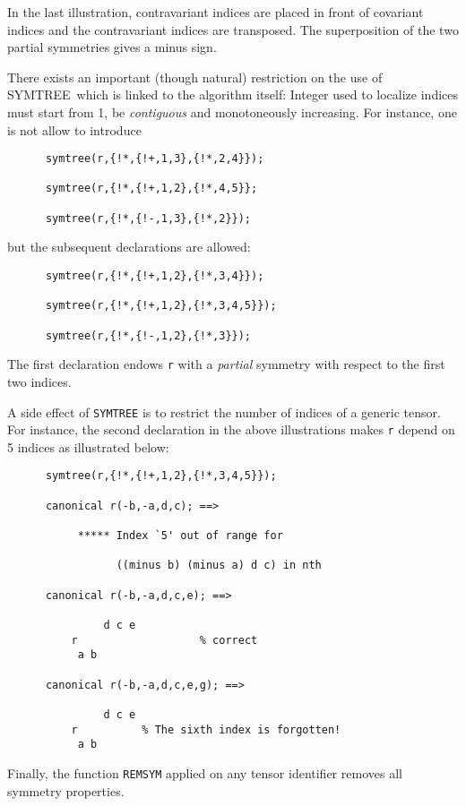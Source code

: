 In the last illustration, contravariant indices are placed in front
of covariant indices and the contravariant indices are transposed.
The superposition of the two partial symmetries gives a minus sign.

There exists an important (though natural) restriction on the use of
SYMTREE\ which is linked to the algorithm itself: Integer used to localize
indices must start from 1, be \emph{contiguous} and monotoneously increasing.
For instance, one is not allow to introduce
\begin{verbatim}
      symtree(r,{!*,{!+,1,3},{!*,2,4}});

      symtree(r,{!*,{!+,1,2},{!*,4,5}};

      symtree(r,{!*,{!-,1,3},{!*,2}});
\end{verbatim}
but the subsequent declarations are allowed:
\begin{verbatim}
      symtree(r,{!*,{!+,1,2},{!*,3,4}});

      symtree(r,{!*,{!+,1,2},{!*,3,4,5}});

      symtree(r,{!*,{!-,1,2},{!*,3}});
\end{verbatim}
The first declaration endows \texttt{r} with a \emph{partial} symmetry
with respect to the first two indices.

A side effect of \texttt{SYMTREE} is to restrict the number of indices of
a generic tensor. For instance, the second declaration in the above
illustrations makes \texttt{r} depend on 5 indices as illustrated below:
\begin{verbatim}
      symtree(r,{!*,{!+,1,2},{!*,3,4,5}});

      canonical r(-b,-a,d,c); ==>

           ***** Index `5' out of range for

                 ((minus b) (minus a) d c) in nth

      canonical r(-b,-a,d,c,e); ==>

               d c e
          r                   % correct
           a b

      canonical r(-b,-a,d,c,e,g); ==>

               d c e
          r          % The sixth index is forgotten!
           a b
\end{verbatim}
Finally, the function \texttt{REMSYM} applied on any tensor
identifier removes all symmetry properties.

